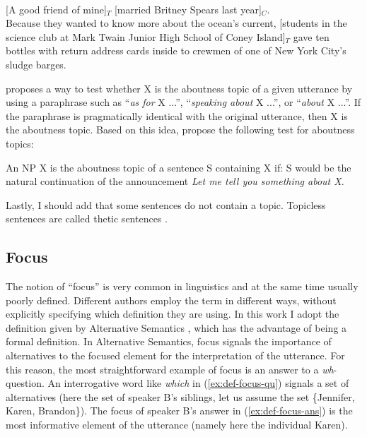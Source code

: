 \eal
\ex \citep[42]{Krifka.2007}\\
{} [A good friend of mine]$_T$ [married Britney Spears last year]$_C$.
\ex \citep[66]{Reinhart.1982}\\%
Because they wanted to know more about the ocean's current, [students in the science club at Mark Twain Junior High School of Coney Island]$_T$ gave ten bottles with return address cards inside to crewmen of one of New York City's sludge barges.
\zl 

\citet[Section~3.2]{Reinhart.1982} proposes a way to test whether X is the aboutness topic of a given utterance by using a paraphrase such as ``\emph{as for} X ...'', ``\emph{speaking about} X ...'', or ``\emph{about} X ...''. If the paraphrase is pragmatically identical with the original utterance, then X is the aboutness topic. 
Based on this idea, \citeauthor{Goetze.2007} propose the following test for aboutness topics:

\ea An NP X is the aboutness topic of a sentence S containing X if: S would be the natural continuation of the announcement \emph{Let me tell you something about X}. \citep[19]{Goetze.2007}
\z 

Lastly, I should add that some sentences do not contain a topic. Topicless sentences are called thetic sentences \citep{Kuroda.1976,Ladusaw.1994}. 

\subsection{Focus}

The notion of ``focus'' is very common in linguistics and at the same time usually poorly defined. Different authors employ the term in different ways, without explicitly specifying which definition they are using. In this work I adopt the definition given by Alternative Semantics \citep{Rooth.1992}, which has the advantage of being a formal definition. In Alternative Semantics, focus signals the importance of alternatives to the focused element for the interpretation of the utterance. For this reason, the most straightforward example of focus is an answer to a \emph{wh}-question. An interrogative word like \emph{which} in (\ref{ex:def-focus-qu}) signals a set of alternatives (here the set of speaker B's siblings, let us assume the set \{Jennifer, Karen, Brandon\}). The focus of speaker B's answer in (\ref{ex:def-focus-ans}) is the most informative element of the utterance (namely here the individual Karen).


